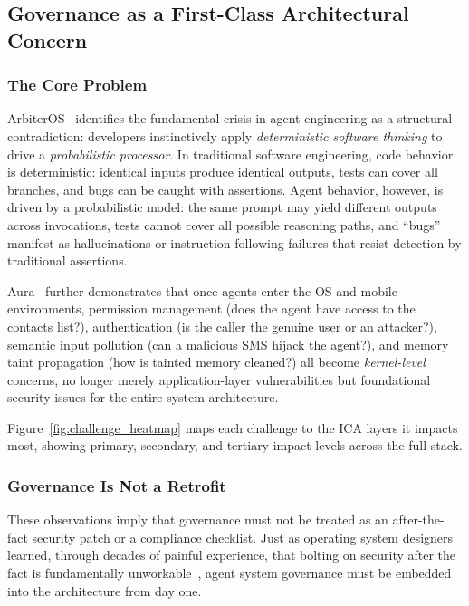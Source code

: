 \subsection{Governance as a First-Class Architectural Concern}

\subsubsection{The Core Problem}
ArbiterOS~\cite{arbiteros2025} identifies the fundamental crisis in agent engineering as a structural contradiction: developers instinctively apply \emph{deterministic software thinking} to drive a \emph{probabilistic processor}.
In traditional software engineering, code behavior is deterministic: identical inputs produce identical outputs, tests can cover all branches, and bugs can be caught with assertions.
Agent behavior, however, is driven by a probabilistic model: the same prompt may yield different outputs across invocations, tests cannot cover all possible reasoning paths, and ``bugs'' manifest as hallucinations or instruction-following failures that resist detection by traditional assertions.

Aura~\cite{aura2025} further demonstrates that once agents enter the OS and mobile environments, permission management (does the agent have access to the contacts list?), authentication (is the caller the genuine user or an attacker?), semantic input pollution (can a malicious SMS hijack the agent?), and memory taint propagation (how is tainted memory cleaned?) all become \emph{kernel-level} concerns, no longer merely application-layer vulnerabilities but foundational security issues for the entire system architecture.

Figure~\ref{fig:challenge_heatmap} maps each challenge to the ICA layers it impacts most, showing primary, secondary, and tertiary impact levels across the full stack.


\subsubsection{Governance Is Not a Retrofit}
These observations imply that governance must not be treated as an after-the-fact security patch or a compliance checklist.
Just as operating system designers learned, through decades of painful experience, that bolting on security after the fact is fundamentally unworkable~\cite{ostep_2023}, agent system governance must be embedded into the architecture from day one.

